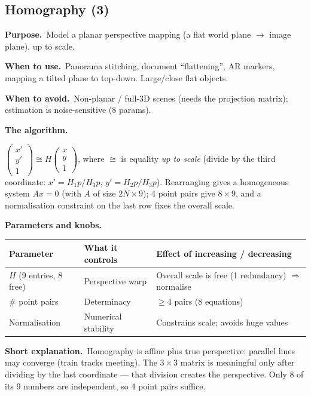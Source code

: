 \documentclass[10pt]{article}
\makeatletter
\newcommand{\Purpose}{\par\smallskip\textbf{Purpose.}\ }
\newcommand{\WhenUse}{\par\textbf{When to use.}\ }
\newcommand{\WhenAvoid}{\par\textbf{When to avoid.}\ }
\newcommand{\TheAlgo}{\par\smallskip\textbf{The algorithm.}\par\nopagebreak}
\newcommand{\Knobs}{\par\smallskip\textbf{Parameters and knobs.}\par\nopagebreak}
\newcommand{\ShortExp}{\par\smallskip\textbf{Short explanation.}\ }
\newenvironment{ptable}{\begin{center}\small\begin{tabular}{@{}p{2.5cm} p{5.9cm} p{6.2cm}@{}}\toprule
Parameter & What it controls & Effect of increasing / decreasing \\ \midrule}
{\bottomrule\end{tabular}\end{center}}
\makeatother
\begin{document}
\subsection{Homography (3)}
\Purpose Model a planar perspective mapping (a flat world plane $\to$ image plane), up to scale.
\WhenUse Panorama stitching, document ``flattening'', AR markers, mapping a tilted plane to top-down.
Large/close flat objects.
\WhenAvoid Non-planar / full-3D scenes (needs the projection matrix); estimation is noise-sensitive (8
params).
\TheAlgo $\begin{pmatrix}x'\\y'\\1\end{pmatrix}\cong H\begin{pmatrix}x\\y\\1\end{pmatrix}$, where $\cong$
is equality \emph{up to scale} (divide by the third coordinate: $x'=H_1p/H_3p$, $y'=H_2p/H_3p$). Rearranging
gives a homogeneous system $Ax=0$ (with $A$ of size $2N\times9$); 4 point pairs give $8\times9$, and a
normalisation constraint on the last row fixes the overall scale.
\Knobs
\begin{ptable}
$H$ (9 entries, 8 free) & Perspective warp & Overall scale is free (1 redundancy) $\Rightarrow$ normalise \\
\# point pairs & Determinacy & $\geq4$ pairs (8 equations) \\
Normalisation & Numerical stability & Constrains scale; avoids huge values \\
\end{ptable}
\ShortExp Homography is affine plus true perspective: parallel lines may converge (train tracks meeting).
The $3\times3$ matrix is meaningful only after dividing by the last coordinate --- that division creates
the perspective. Only 8 of its 9 numbers are independent, so 4 point pairs suffice.

\end{document}
